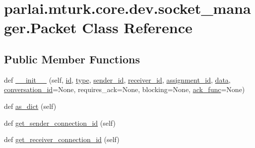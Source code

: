 \hypertarget{classparlai_1_1mturk_1_1core_1_1dev_1_1socket__manager_1_1Packet}{}\section{parlai.\+mturk.\+core.\+dev.\+socket\+\_\+manager.\+Packet Class Reference}
\label{classparlai_1_1mturk_1_1core_1_1dev_1_1socket__manager_1_1Packet}
\subsection*{Public Member Functions}
\begin{DoxyCompactItemize}
\item 
def \hyperlink{classparlai_1_1mturk_1_1core_1_1dev_1_1socket__manager_1_1Packet_a7e36ad36f81a8e412efa30404b7dd07d}{\+\_\+\+\_\+init\+\_\+\+\_\+} (self, \hyperlink{classparlai_1_1mturk_1_1core_1_1dev_1_1socket__manager_1_1Packet_a451091aed811f2901c213986fc86d020}{id}, \hyperlink{classparlai_1_1mturk_1_1core_1_1dev_1_1socket__manager_1_1Packet_acc5963f125182087b623a3adde523c89}{type}, \hyperlink{classparlai_1_1mturk_1_1core_1_1dev_1_1socket__manager_1_1Packet_a3095d75963017368974bd34c3aacfe8c}{sender\+\_\+id}, \hyperlink{classparlai_1_1mturk_1_1core_1_1dev_1_1socket__manager_1_1Packet_af453648a5280b925750d4305dcd2404a}{receiver\+\_\+id}, \hyperlink{classparlai_1_1mturk_1_1core_1_1dev_1_1socket__manager_1_1Packet_ae1819bd7ee66a1e798fbfd091ebf060e}{assignment\+\_\+id}, \hyperlink{classparlai_1_1mturk_1_1core_1_1dev_1_1socket__manager_1_1Packet_a55eb8eaaff74df589a544a1133434bac}{data}, \hyperlink{classparlai_1_1mturk_1_1core_1_1dev_1_1socket__manager_1_1Packet_a4214fa53d6892dbfaa37cf6e3503f945}{conversation\+\_\+id}=None, requires\+\_\+ack=None, blocking=None, \hyperlink{classparlai_1_1mturk_1_1core_1_1dev_1_1socket__manager_1_1Packet_a8a1db141ef73f663d032aa493825b4a2}{ack\+\_\+func}=None)
\item 
def \hyperlink{classparlai_1_1mturk_1_1core_1_1dev_1_1socket__manager_1_1Packet_a806382fb1c252d86229e9f846cfec6c9}{as\+\_\+dict} (self)
\item 
def \hyperlink{classparlai_1_1mturk_1_1core_1_1dev_1_1socket__manager_1_1Packet_a65f708d63e94b812df966323c6c4e4b1}{get\+\_\+sender\+\_\+connection\+\_\+id} (self)
\item 
def \hyperlink{classparlai_1_1mturk_1_1core_1_1dev_1_1socket__manager_1_1Packet_a2525f38d0e5c24c92f4c1aed80423a37}{get\+\_\+receiver\+\_\+connection\+\_\+id} (self)

\end{DoxyCompactItemize}
